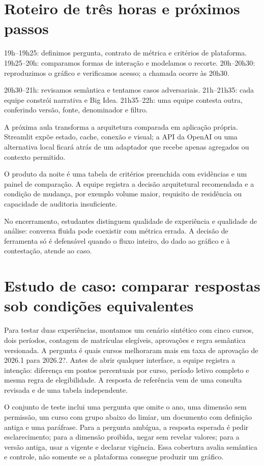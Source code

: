 \section{Roteiro de três horas e próximos passos}

19h--19h25: definimos pergunta, contrato de métrica e critérios de plataforma. 19h25--20h: comparamos formas de interação e modelamos o recorte. 20h--20h30: reproduzimos o gráfico e verificamos acesso; a chamada ocorre às 20h30.

20h30--21h: revisamos semântica e tentamos casos adversariais. 21h--21h35: cada equipe constrói narrativa e Big Idea. 21h35--22h: uma equipe contesta outra, conferindo versão, fonte, denominador e filtro.

A próxima aula transforma a arquitetura comparada em aplicação própria. Streamlit expõe estado, cache, conexão e visual; a API da OpenAI ou uma alternativa local ficará atrás de um adaptador que recebe apenas agregados ou contexto permitido.

O produto da noite é uma tabela de critérios preenchida com evidências e um painel de comparação. A equipe registra a decisão arquitetural recomendada e a condição de mudança, por exemplo volume maior, requisito de residência ou capacidade de auditoria insuficiente.

No encerramento, estudantes distinguem qualidade de experiência e qualidade de análise: conversa fluida pode coexistir com métrica errada. A decisão de ferramenta só é defensável quando o fluxo inteiro, do dado ao gráfico e à contestação, atende ao caso.

\section{Estudo de caso: comparar respostas sob condições equivalentes}

Para testar duas experiências, montamos um cenário sintético com cinco cursos, dois períodos, contagem de matrículas elegíveis, aprovações e regra semântica versionada. A pergunta é quais cursos melhoraram mais em taxa de aprovação de 2026.1 para 2026.2?. Antes de abrir qualquer interface, a equipe registra a intenção: diferença em pontos percentuais por curso, período letivo completo e mesma regra de elegibilidade. A resposta de referência vem de uma consulta revisada e de uma tabela independente.

O conjunto de teste inclui uma pergunta que omite o ano, uma dimensão sem permissão, um curso com grupo abaixo do limiar, um documento com definição antiga e uma paráfrase. Para a pergunta ambígua, a resposta esperada é pedir esclarecimento; para a dimensão proibida, negar sem revelar valores; para a versão antiga, usar a vigente e declarar vigência. Essa cobertura avalia semântica e controle, não somente se a plataforma consegue produzir um gráfico.

